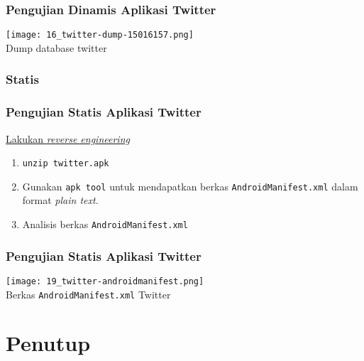 \documentclass[xcolor=pdftex,table,10pt]{beamer}
\begin{document}
\begin{frame}
	\frametitle{Pengujian Dinamis Aplikasi Twitter}
	\begin{center}
		\texttt{[image: 16\_twitter-dump-15016157.png]} \\
		Dump database twitter
	\end{center}
\end{frame}

\subsubsection{Statis}
\begin{frame}
	\frametitle{Pengujian Statis Aplikasi Twitter}
	\underline{Lakukan \textit{reverse engineering}}	
	\begin{enumerate}
		\item \texttt{unzip twitter.apk}
		\item Gunakan \texttt{apk tool} untuk mendapatkan berkas \texttt{AndroidManifest.xml} dalam format \textit{plain text}.
		\item Analisis berkas \texttt{AndroidManifest.xml}		
	\end{enumerate}		
\end{frame}

\begin{frame}
	\frametitle{Pengujian Statis Aplikasi Twitter}
	\begin{center}	
	\texttt{[image: 19\_twitter-androidmanifest.png]} \\
	Berkas \texttt{AndroidManifest.xml} Twitter
	\end{center}
\end{frame}

\section{Penutup}
\end{document}
